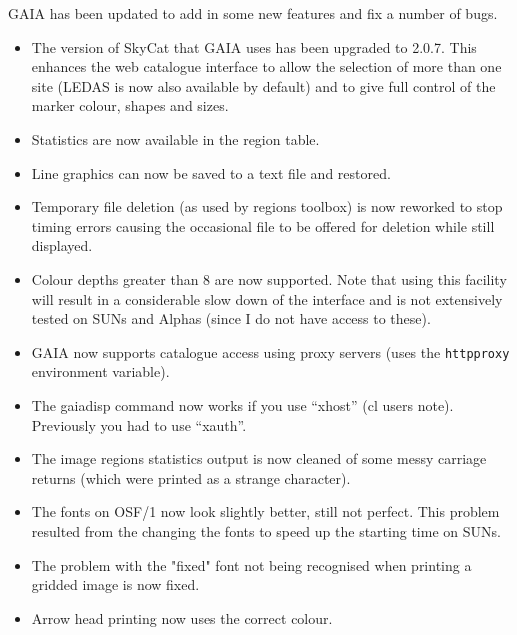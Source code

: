 \documentclass[twoside,11pt]{article}
\renewcommand{\_}{\texttt{\symbol{95}}}
\begin{document}
GAIA has been updated to add in some new features and fix a number of
bugs.
\begin{itemize}
    \item The version of SkyCat that GAIA uses has been upgraded to
      2.0.7. This enhances the web catalogue interface to allow
      the selection of more than one site (LEDAS is now also available
      by default) and to give full control of the marker colour,
      shapes and sizes.

    \item  Statistics are now available in the region table.

    \item  Line graphics can now be saved to a text file and restored.

    \item Temporary file deletion (as used by regions toolbox) is now
      reworked to stop timing errors causing the occasional file to
      be offered for deletion while still displayed.

    \item Colour depths greater than 8 are now supported. Note that using
      this facility will result in a considerable slow down of the
      interface and is not extensively tested on SUNs and Alphas
      (since I do not have access to these).

    \item GAIA now supports catalogue access using proxy servers (uses
      the {\tt http\_proxy} environment variable).

    \item The gaiadisp command now works if you use ``xhost'' (cl users
      note). Previously you had to use ``xauth''.

    \item The image regions statistics output is now cleaned of some messy
      carriage returns (which were printed as a strange character).

    \item The fonts on OSF/1 now look slightly better, still not perfect.
      This problem resulted from the changing the fonts to speed up
      the starting time on SUNs.

    \item The problem with the "fixed" font not being recognised when
      printing a gridded image is now fixed.

    \item Arrow head printing now uses the correct colour.


\end{itemize}
\end{document}
